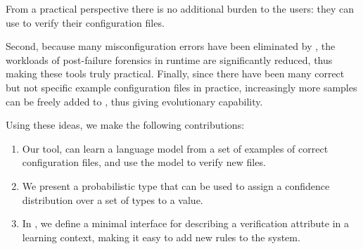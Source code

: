 From a  practical perspective there is no additional burden 
to the users: they can use \app to verify their configuration files.


Second, because many misconfiguration errors have been eliminated 
by \app, the workloads of post-failure forensics in runtime
are significantly reduced, thus making these tools truly practical.
Finally, since there have been many correct but not specific 
example configuration files in practice, 
increasingly more samples can be freely added to \app,
thus giving \app evolutionary capability.

Using these ideas, we make the following contributions:

\begin{enumerate}

  \item Our tool, \app can learn a language model from a set of examples of correct configuration files, and use the model to verify new files.
  \item We present a probabilistic type that can be used to assign a confidence distribution over a set of types to a value.
  \item In \app, we define a minimal interface for describing a verification attribute in a learning context, making it easy to add new rules to the system.

\end{enumerate}
